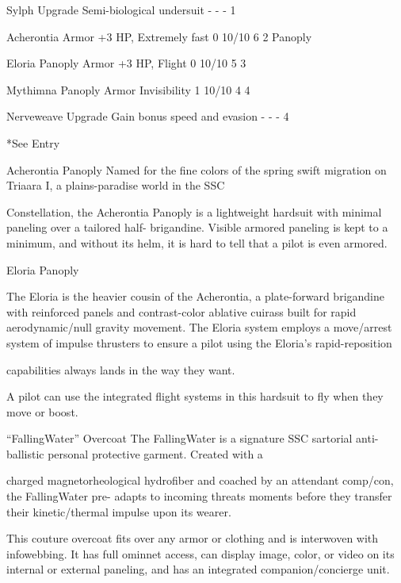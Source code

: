 Sylph                    Upgrade       Semi-biological undersuit                -            -            -       1 

 Acherontia              Armor          +3 HP, Extremely fast                    0            10/10        6      2 
 Panoply 

 Eloria Panoply          Armor          +3 HP, Flight                            0            10/10        5      3 

 Mythimna Panoply        Armor          Invisibility                             1            10/10        4      4 

 Nerveweave               Upgrade       Gain bonus speed and evasion             -            -            -      4 

*See Entry
 

Acherontia Panoply  
Named for the fine colors of the spring swift migration on Triaara I, a plains-paradise world in the SSC  

Constellation, the Acherontia Panoply is a lightweight hardsuit with minimal paneling over a tailored half- 
brigandine. Visible armored paneling is kept to a minimum, and without its helm, it is hard to tell that a pilot  
is even armored.   

Eloria Panoply  

The Eloria is the heavier cousin of the Acherontia, a plate-forward brigandine with reinforced panels and  
contrast-color ablative cuirass built for rapid aerodynamic/null gravity movement. The Eloria system  
employs a move/arrest system of impulse thrusters to ensure a pilot using the Eloria’s rapid-reposition  

capabilities always lands in the way they want. 
 

A pilot can use the integrated flight systems in this hardsuit to fly when they move or boost.
 

“FallingWater” Overcoat  
The FallingWater is a signature SSC sartorial anti-ballistic personal protective garment. Created with a  

                                                                                                                        


charged magnetorheological hydrofiber and coached by an attendant comp/con, the FallingWater pre- 
adapts to incoming threats moments before they transfer their kinetic/thermal impulse upon its wearer.   

This couture overcoat fits over any armor or clothing and is interwoven with infowebbing. It has full  
ominnet access, can display image, color, or video on its internal or external paneling, and has an  
integrated companion/concierge unit. 
 

